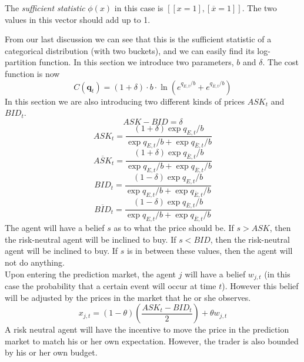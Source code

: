 \documentclass{article}
\begin{document}
    The \emph{sufficient statistic} $\phi(x)$ in this case is $[[x=1], [\overline{x}=1]]$. The two values in this vector should add up to 1.

    From our last discussion we can see that this is the sufficient statistic of a categorical distribution (with two buckets), and we can easily find its log-partition function. In this section we introduce two parameters, $b$ and $\delta$. The cost function is now
    \begin{displaymath}
    C(\textbf{q}_t)=(1+\delta)\cdot b \cdot \ln({e^{q_{E,t}/b}+e^{q_{\overline{E},t}/b}})
    \end{displaymath}
    In this section we are also introducing two different kinds of prices $ASK_t$ and $BID_t$.
    \begin{displaymath}
    ASK-BID = \delta
    \end{displaymath}
    \begin{displaymath}
    ASK_t=\frac{(1+\delta)\exp{q_{E,t}/b}}{\exp{q_{E,t}/b}+\exp{q_{\overline{E},t}/b}}
    \end{displaymath}
    \begin{displaymath}
    \overline{ASK}_t=\frac{(1+\delta)\exp{q_{\overline{E},t}/b}}{\exp{q_{E,t}/b}+\exp{q_{\overline{E},t}/b}}
    \end{displaymath}
    \begin{displaymath}
    BID_t=\frac{(1-\delta)\exp{q_{E,t}/b}}{\exp{q_{E,t}/b}+\exp{q_{\overline{E},t}/b}}
    \end{displaymath}
    \begin{displaymath}
    \overline{BID}_t=\frac{(1-\delta)\exp{q_{\overline{E},t}/b}}{\exp{q_{E,t}/b}+\exp{q_{\overline{E},t}/b}}
    \end{displaymath}
    The agent will have a belief $s$ as to what the price should be. If $s>ASK$, then the risk-neutral agent will be inclined to buy. If $s<BID$, then the risk-neutral agent will be inclined to buy. If $s$ is in between these values, then the agent will not do anything. \\
    Upon entering the prediction market, the agent $j$ will have a belief $w_{j,t}$ (in this case the probability that a certain event will occur at time $t$). However this belief will be adjusted by the prices in the market that he or she observes.
    \begin{displaymath}
    x_{j,t}=(1-\theta)\left(\frac{ASK_t-BID_t}{2}\right)+\theta w_{j,t}
    \end{displaymath}
    A risk neutral agent will have the incentive to move the price in the prediction market to match his or her own expectation. However, the trader is also bounded by his or her own budget.
\end{document}
